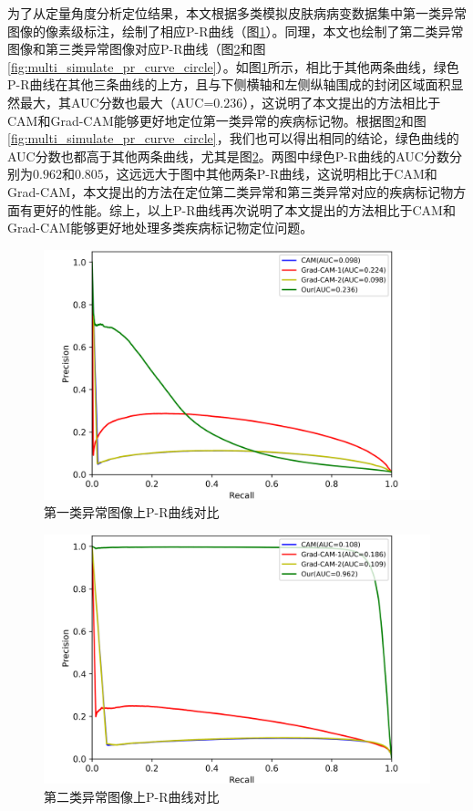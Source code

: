 为了从定量角度分析定位结果，本文根据多类模拟皮肤病病变数据集中第一类异常图像的像素级标注，绘制了相应P-R曲线（图\ref{fig:multi_simulate_pr_curve_image_net}）。同理，本文也绘制了第二类异常图像和第三类异常图像对应P-R曲线（图\ref{fig:multi_simulate_pr_curve_skin}和图\ref{fig:multi_simulate_pr_curve_circle}）。如图\ref{fig:multi_simulate_pr_curve_image_net}所示，相比于其他两条曲线，绿色P-R曲线在其他三条曲线的上方，且与下侧横轴和左侧纵轴围成的封闭区域面积显然最大，其AUC分数也最大（AUC=$0.236$），这说明了本文提出的方法相比于CAM和Grad-CAM能够更好地定位第一类异常的疾病标记物。根据图\ref{fig:multi_simulate_pr_curve_skin}和图\ref{fig:multi_simulate_pr_curve_circle}，我们也可以得出相同的结论，绿色曲线的AUC分数也都高于其他两条曲线，尤其是图\ref{fig:multi_simulate_pr_curve_skin}。两图中绿色P-R曲线的AUC分数分别为$0.962$和$0.805$，这远远大于图中其他两条P-R曲线，这说明相比于CAM和Grad-CAM，本文提出的方法在定位第二类异常和第三类异常对应的疾病标记物方面有更好的性能。综上，以上P-R曲线再次说明了本文提出的方法相比于CAM和Grad-CAM能够更好地处理多类疾病标记物定位问题。
\begin{figure}[H]
	\centering
	\includegraphics[width=1.0\textwidth]{figure/pr_curve_multi_skin/IMAGE_NET_pr_curve.png}
	\caption{第一类异常图像上P-R曲线对比} 
	\label{fig:multi_simulate_pr_curve_image_net}
\end{figure}
\vspace{-0.5cm}
\begin{figure}[H]
	\centering
	\includegraphics[width=1.0\textwidth]{figure/pr_curve_multi_skin/SKIN_pr_curve.png}
	\caption{第二类异常图像上P-R曲线对比} 
	\label{fig:multi_simulate_pr_curve_skin}
\end{figure}
